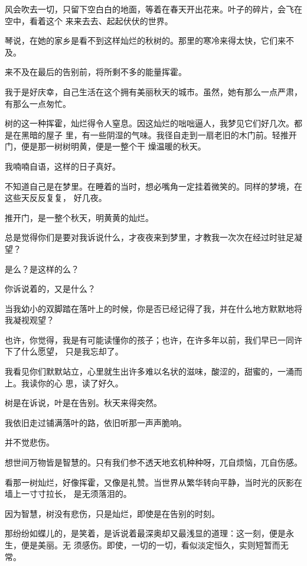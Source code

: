 		风会吹去一切，只留下空白白的地面，等着在春天开出花来。叶子的碎片，会飞在空中，看着这个
	来来去去、起起伏伏的世界。

		琴说，在她的家乡是看不到这样灿烂的秋树的。那里的寒冷来得太快，它们来不及。

		来不及在最后的告别前，将所剩不多的能量挥霍。

		我于是好庆幸，自己生活在这个拥有美丽秋天的城市。虽然，她有那么一点严肃，有那么一点匆忙。

		树的这一种挥霍，灿烂得令人窒息。因这灿烂的咄咄逼人，我梦见它们好几次。都是在黑暗的屋子
	里，有一些阴湿的气味。我径自走到一扇老旧的木门前。轻推开门，便是那一树树明黄，便是一整个干
	燥温暖的秋天。

		我喃喃自语，这样的日子真好。

		不知道自己是在梦里。在睡着的当时，想必嘴角一定挂着微笑的。同样的梦境，在这些天反反复复，
	好几夜。

		推开门，是一整个秋天，明黄黄的灿烂。

		总是觉得你们是要对我诉说什么，才夜夜来到梦里，才教我一次次在经过时驻足凝望？

		是么？是这样的么？

		你诉说着的，又是什么？

		当我幼小的双脚踏在落叶上的时候，你是否已经记得了我，并在什么地方默默地将我凝视观望？

		也许，你觉得，我是有可能读懂你的孩子；也许，在许多年以前，我们早已一同许下了什么愿望，
	只是我忘却了。

		我看见你们默默站立，心里就生出许多难以名状的滋味，酸涩的，甜蜜的，一涌而上。我读你的心
	思，读了好久。

		树是在诉说，叶是在告别。秋天来得突然。

		我依旧走过铺满落叶的路，依旧听那一声声脆响。

		并不觉悲伤。

		想世间万物皆是智慧的。只有我们参不透天地玄机种种呀，兀自烦恼，兀自伤感。

		看那一树灿烂，好像挥霍，又像是礼赞。当世界从繁华转向平静，当时光的灰影在墙上一寸寸拉长，
	是无须落泪的。

		因为智慧，树没有悲伤，只是灿烂，即使是在告别的时刻。

		那纷纷如蝶儿的，是笑着，是诉说着最深奥却又最浅显的道理：这一刻，便是永生，便是美丽。无
	须感伤。即使，一切的一切，看似淡定恒久，实则短暂而无常。

	\endwriting



